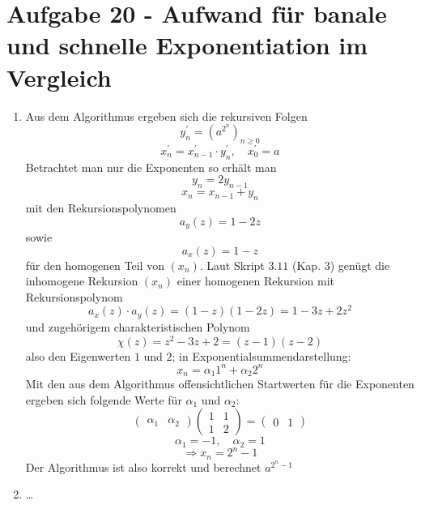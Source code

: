 \section*{Aufgabe 20 - Aufwand für banale und schnelle Exponentiation im
Vergleich}
\begin{enumerate}
\item
  Aus dem Algorithmus ergeben sich die rekursiven Folgen
  \[ y_{n}^{'} = (a^{2^{n}})_{n\geq 0} \]
  \[ x_{n}^{'} = x_{n-1}^{'} \cdot y_{n}^{'}, \quad x_{0}^{'} = a \]
  Betrachtet man nur die Exponenten so erhält man
  \[ y_{n} = 2y_{n-1} \]
  \[ x_{n} = x_{n-1} + y_{n} \]
  mit den Rekursionspolynomen
  \[ a_{y}(z) = 1 - 2z \]
  sowie
  \[ a_{x}(z) = 1 - z \]
  für den homogenen Teil von $(x_{n})$.
  Laut Skript $3.11$ (Kap. $3$) genügt die inhomogene Rekursion $(x_{n})$ einer
  homogenen Rekursion mit Rekursionspolynom
  \[ a_{x}(z) \cdot a_{y}(z) = (1 - z)(1 - 2z) = 1 - 3z + 2z^{2} \]
  und zugehörigem charakteristischen Polynom
  \[ \chi(z)= z^{2} - 3z + 2 = (z - 1)(z - 2) \]
  also den Eigenwerten $1$ und $2$; in Exponentialsummendarstellung:
  \[ x_{n} = \alpha_{1}1^{n} + \alpha_{2}2^{n} \]
  Mit den aus dem Algorithmus offensichtlichen Startwerten für die Exponenten
  ergeben sich folgende Werte für $\alpha_{1}$ und $\alpha_{2}$:
  \[ \begin{pmatrix} \alpha_{1} & \alpha_{2} \end{pmatrix} 
     \begin{pmatrix} 1 & 1 \\ 1 & 2 \end{pmatrix} = \begin{pmatrix} 0 & 1
     \end{pmatrix} \]
  \[ \alpha_{1} = -1, \quad \alpha_{2} = 1 \]
  \[ \Rightarrow x_{n} = 2^{n} - 1 \]
  Der Algorithmus ist also korrekt und berechnet $a^{2^{n}-1}$
\item \dots
\end{enumerate}
